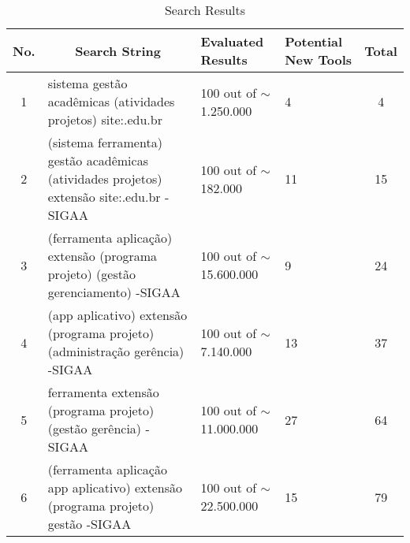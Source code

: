 \begin{table}[!htb]
  \centering
  \caption{Search Results}
  \label{tbl:gl-search-results}
  \scriptsize
  \begin{tabular}{c|p{6cm}|l|p{1.5cm}|c}
    \bottomrule
    \rowcolor[rgb]{0.753,0.753,0.753} \textbf{No.} & \multicolumn{1}{c|}{\textbf{Search String}}                                                                                 & \textbf{Evaluated Results}  & \textcolor[rgb]{0.137,0.137,0.145}{\textbf{Potential New Tools}} & \textbf{Total} \\
    \hline
    \rowcolor[rgb]{0.898,0.898,0.898} 1            & sistema gestão acadêmicas (atividades \textbar{} projetos) site:.edu.br                                                     & 100 out of $\sim$1.250.000  & 4                                                                & 4              \\
    2                                              & (sistema \textbar{} ferramenta) gestão acadêmicas (atividades \textbar{} projetos) extensão site:.edu.br -SIGAA             & 100 out of $\sim$182.000    & 11                                                               & 15             \\
    \hhline{>{\arrayrulecolor[rgb]{0.898,0.898,0.898}}->{\arrayrulecolor{black}}->{\arrayrulecolor[rgb]{0.898,0.898,0.898}}---}
    \rowcolor[rgb]{0.898,0.898,0.898} 3            & (ferramenta \textbar{} aplicação) extensão (programa \textbar{} projeto) (gestão \textbar{} gerenciamento) -SIGAA           & 100 out of $\sim$15.600.000 & 9                                                                & 24             \\
    4                                              & (app \textbar{} aplicativo) extensão (programa \textbar{} projeto) (administração \textbar{} gerência) -SIGAA               & 100 out of $\sim$7.140.000  & 13                                                               & 37             \\
    \rowcolor[rgb]{0.898,0.898,0.898} 5            & ferramenta extensão (programa \textbar{} projeto) (gestão \textbar{} gerência) -SIGAA                                       & 100 out of $\sim$11.000.000 & 27                                                               & 64             \\
    6                                              & (ferramenta \textbar{} aplicação \textbar{} app \textbar{} aplicativo) extensão (programa \textbar{} projeto) gestão -SIGAA & 100 out of $\sim$22.500.000 & 15                                                               & 79             \\

\end{tabular}
\end{table}
